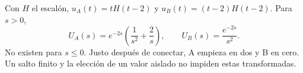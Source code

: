 Con \(H\) el escalón, \(u_A(t)=tH(t-2)\) y \(u_B(t)=(t-2)H(t-2)\). Para \(s>0\),
\[
U_A(s)=e^{-2s}\left(\frac1{s^2}+\frac2s\right),\qquad
U_B(s)=\frac{e^{-2s}}{s^2}.
\]
No existen para \(s\le0\). Justo después de conectar, A empieza en dos y B en cero. Un salto finito y la elección de un valor aislado no impiden estas transformadas.
